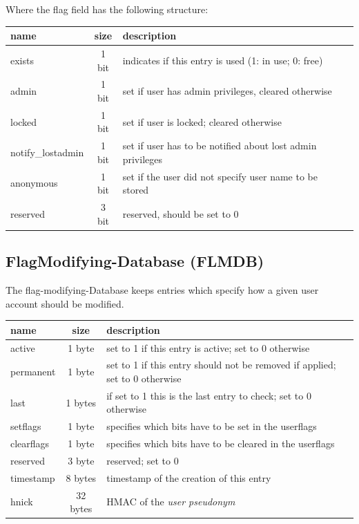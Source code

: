Where the flag field has the following structure: \\
\begin{tabular}{|l|c|p{3.8cm}|l|} \hline
name & size & description \\ \hline 
exists            & 1 bit    &  indicates if this entry is used (1: in use; 0: free)\\
admin             & 1 bit & set if user has admin privileges, cleared otherwise \\
locked            & 1 bit & set if user is locked; cleared otherwise \\
notify\_lostadmin & 1 bit & set if user has to be notified about lost admin privileges \\
anonymous         & 1 bit & set if the user did not specify user name to be stored \\
reserved          & 3 bit & reserved, should be set to 0\\ \hline
\end{tabular} 

\subsection{FlagModifying-Database (FLMDB)}
The flag-modifying-Database keeps entries which specify how a given user account should be modified. \\
\begin{tabular}{|l|c|p{3.8cm}|} \hline
name & size & description \\ \hline 
active     & 1 byte    & set to 1 if this entry is active; set to 0 otherwise \\
permanent  & 1 byte & set to 1 if this entry should not be removed if applied; set to 0 otherwise \\
last       & 1 bytes & if set to 1 this is the last entry to check; set to 0 otherwise \\ 
setflags   & 1 byte & specifies which bits have to be set in the userflags\\
clearflags & 1 byte & specifies which bits have to be cleared in the userflags\\
reserved   & 3 byte & reserved; set to 0\\
timestamp  & 8 bytes & timestamp of the creation of this entry\\
hnick      & 32 bytes & HMAC of the \textit{user pseudonym}\\
\hline
\end{tabular}

